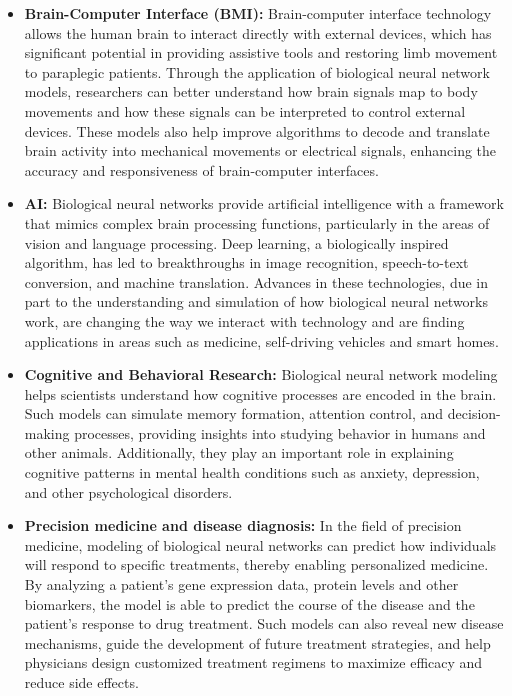 \documentclass[paper=a4, fontsize=11pt]{scrartcl} %
\numberwithin{equation}{section} %
\numberwithin{figure}{section} %
\numberwithin{table}{section} %
\begin{document}
\begin{itemize}
    \item \textbf{ Brain-Computer Interface (BMI):} Brain-computer interface technology allows the human brain to interact directly with external devices, which has significant potential in providing assistive tools and restoring limb movement to paraplegic patients. Through the application of biological neural network models, researchers can better understand how brain signals map to body movements and how these signals can be interpreted to control external devices. These models also help improve algorithms to decode and translate brain activity into mechanical movements or electrical signals, enhancing the accuracy and responsiveness of brain-computer interfaces.
    \item \textbf{AI:} Biological neural networks provide artificial intelligence with a framework that mimics complex brain processing functions, particularly in the areas of vision and language processing. Deep learning, a biologically inspired algorithm, has led to breakthroughs in image recognition, speech-to-text conversion, and machine translation. Advances in these technologies, due in part to the understanding and simulation of how biological neural networks work, are changing the way we interact with technology and are finding applications in areas such as medicine, self-driving vehicles and smart homes.
    \item \textbf{Cognitive and Behavioral Research:} Biological neural network modeling helps scientists understand how cognitive processes are encoded in the brain. Such models can simulate memory formation, attention control, and decision-making processes, providing insights into studying behavior in humans and other animals. Additionally, they play an important role in explaining cognitive patterns in mental health conditions such as anxiety, depression, and other psychological disorders.
    \item \textbf{Precision medicine and disease diagnosis:} In the field of precision medicine, modeling of biological neural networks can predict how individuals will respond to specific treatments, thereby enabling personalized medicine. By analyzing a patient's gene expression data, protein levels and other biomarkers, the model is able to predict the course of the disease and the patient's response to drug treatment. Such models can also reveal new disease mechanisms, guide the development of future treatment strategies, and help physicians design customized treatment regimens to maximize efficacy and reduce side effects.
\end{itemize}




\clearpage
\end{document}
